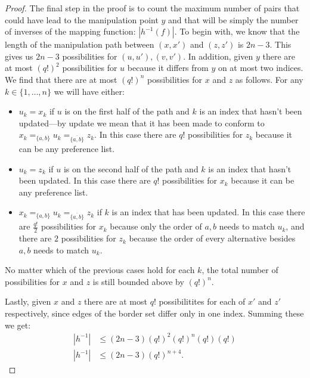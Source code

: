 \begin{proof}
		The final step in the proof is to count the maximum number of pairs that could have lead to the manipulation point $y$ and that will be simply the number of inverses of the mapping function: $|h^{-1}(f)|$. To begin with, we know that the length of the manipulation path between $(x, x')$ and $(z, z')$ is $2n - 3$. This gives us $2n - 3$ possibilities for $(u, u'), (v, v')$. In addition, given $y$ there are at most $(q!)^2$ possibilities for $u$ because it differs from $y$ on at most two indices. We find that there are at most $(q!)^n$ possibilities for $x$ and $z$ as follows. For any $k \in \{1, \ldots, n\}$ we will have either:
		\begin{itemize}
			\item $u_k = x_k$ if $u$ is on the first half of the path and $k$ is an index that hasn't been updated---by update we mean that it has been made to conform to $x_k =_{\{a,b\}} u_k =_{\overline{\{a,b\}}} z_k$. In this case there are $q!$ possibilities for $z_k$ because it can be any preference list.
			\item $u_k = z_k$ if $u$ is on the second half of the path and $k$ is an index that hasn't been updated. In this case there are $q!$ possibilities for $x_k$ because it can be any preference list.
			\item $x_k =_{\{a,b\}} u_k =_{\overline{\{a,b\}}} z_k$ if $k$ is an index that has been updated. In this case there are $\frac{q!}{2}$ possibilities for $x_k$ because only the order of $a, b$ needs to match $u_k$, and there are $2$ possibilities for $z_k$ because the order of every alternative besides $a, b$ needs to match $u_k$.
		\end{itemize}
		No matter which of the previous cases hold for each $k$, the total number of possibilities for $x$ and $z$ is still bounded above by $(q!)^n$.

		Lastly, given $x$ and $z$ there are at most $q!$ possibilitites for each of $x'$ and $z'$ respectively, since edges of the border set differ only in one index. Summing these we get:
		\begin{align*}
			|h^{-1}| &\le (2n - 3)(q!)^2(q!)^n(q!)(q!) \\
			|h^{-1}| &\le (2n - 3)(q!)^{n+4}.
		\end{align*}

	\end{proof}


